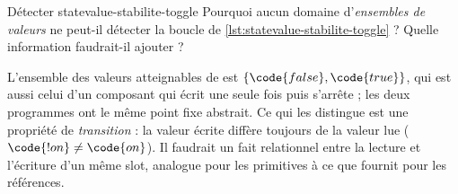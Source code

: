 \begin{exercice}{Détecter }{statevalue-stabilite-toggle}
  Pourquoi aucun domaine d'\emph{ensembles de valeurs} ne peut-il détecter
  la boucle de \cref{lst:statevalue-stabilite-toggle} ? Quelle information
  faudrait-il ajouter ?
\end{exercice}
\begin{solution}
  L'ensemble des valeurs atteignables de  est $\{\code{false},
  \code{true}\}$, qui est aussi celui d'un composant qui écrit une seule
  fois  puis s'arrête ; les deux programmes ont le même point fixe
  abstrait. Ce qui les distingue est une propriété de \emph{transition} :
  \og la valeur écrite diffère toujours de la valeur lue\fg{}
  ($\code{!on} \ne \code{on}$). Il faudrait un fait relationnel entre la
  lecture et l'écriture d'un même slot, analogue pour les primitives à ce
  que  fournit pour les références.
\end{solution}
